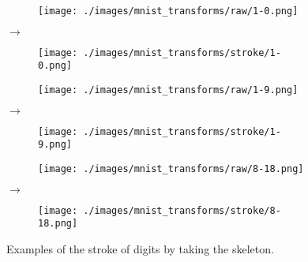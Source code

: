 \begin{figure}[H]
    \centering

    \begin{subfigure}{.15\columnwidth}
        \centering
        \texttt{[image: ./images/mnist\_transforms/raw/1-0.png]}
        \caption{}
        \label{fig:stroke_orig1}
    \end{subfigure}%
    $\rightarrow$
    \begin{subfigure}{.15\columnwidth}
        \centering
        \texttt{[image: ./images/mnist\_transforms/stroke/1-0.png]}
        \caption{}
        \label{fig:stroke_transform1}
    \end{subfigure}

    \par\medskip

    \begin{subfigure}{.15\columnwidth}
        \centering
        \texttt{[image: ./images/mnist\_transforms/raw/1-9.png]}
        \caption{}
        \label{fig:stroke_orig2}
    \end{subfigure}%
    $\rightarrow$
    \begin{subfigure}{.15\columnwidth}
        \centering
        \texttt{[image: ./images/mnist\_transforms/stroke/1-9.png]}
        \caption{}
        \label{fig:stroke_transform2}
    \end{subfigure}%

    \par\medskip

    \begin{subfigure}{.15\columnwidth}
        \centering
        \texttt{[image: ./images/mnist\_transforms/raw/8-18.png]}
        \caption{}
        \label{fig:stroke_orig3}
    \end{subfigure}%
    $\rightarrow$
    \begin{subfigure}{.15\columnwidth}
        \centering
        \texttt{[image: ./images/mnist\_transforms/stroke/8-18.png]}
        \caption{}
        \label{fig:stroke_transform3}
    \end{subfigure}%

    \caption{Examples of the stroke of digits by taking the skeleton.}
    \label{fig:skeleton_examples}
\end{figure}

